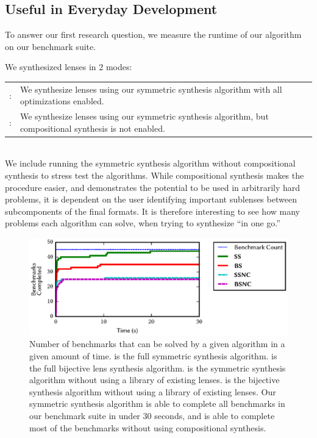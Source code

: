 \documentclass[acmsmall,screen,anonymous]{acmart}
\begin{document}
\subsection{Useful in Everyday Development}

To answer our first research question, we measure the runtime of our algorithm
on our benchmark suite.

We synthesized lenses in 2 modes:

\begin{tabulary}{\linewidth}{rL}
  \SSOpt{}: & We synthesize lenses using our symmetric synthesis algorithm with all optimizations enabled.\\
  \SSNCOpt{}: & We synthesize lenses using our symmetric synthesis algorithm,
                but compositional synthesis is not enabled.\\
\end{tabulary}\\

We include running the symmetric synthesis algorithm without compositional
synthesis to stress test the algorithms. While compositional synthesis makes the
procedure easier, and demonstrates the potential to be used in arbitrarily hard
problems, it is dependent on the user identifying important sublenses between
subcomponents of the final formats. It is therefore interesting to see how many
problems each algorithm can solve, when trying to synthesize ``in one go.''

\begin{figure}
  \includegraphics{generated-graphs/times}
  \caption{Number of benchmarks that can be solved by a given algorithm in a
    given amount of time. \SSOpt{} is the full symmetric synthesis algorithm.
    \BSOpt{} is the full bijective lens synthesis algorithm. \SSNCOpt{} is the
    symmetric synthesis algorithm without using a library of existing lenses.
    \BSNCOpt{} is the bijective synthesis algorithm without using a library of
    existing lenses. Our symmetric synthesis algorithm is able to complete all
    benchmarks in our benchmark suite in under 30 seconds, and is able to
    complete most of the benchmarks without using compositional synthesis.
    }
  \label{fig:times}
\end{figure}
\end{document}

